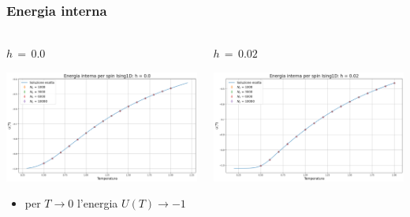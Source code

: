 \begin{frame}
    \frametitle{Energia interna}
    \framesubtitle{}

    \begin{columns}
        \begin{column}{0.5\textwidth}
            \begin{block}{$h\,=\,0.0$}

            \centering
            \includegraphics[width=\textwidth]{Immagini/simIsing1D/ene_h0.0.png}

            \vspace{0.5cm}
            \begin{itemize}[itemsep=0.5em, label=$\diamond$]
                \item per $T \to 0$ l'energia $U\left(T\right) \to -1$
            \end{itemize}
            
            \end{block}
        \end{column}
    
        \begin{column}{0.5\textwidth}
            \begin{block}{$h\,=\,0.02$}

                \centering
                \includegraphics[width=\textwidth]{Immagini/simIsing1D/ene_h0.02.png}


\end{block}
\end{column}
\end{columns}
\end{frame}
